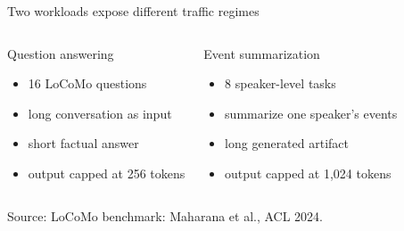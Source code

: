 \documentclass[aspectratio=169,10pt]{beamer}
\newcommand{\source}[1]{\vfill{\tiny\color{gray}Source: #1}}
\begin{document}
\begin{frame}{Two workloads expose different traffic regimes}
  \begin{columns}[T,onlytextwidth]
      \begin{block}{Question answering}
        \vspace{0.1cm}
        \begin{itemize}
          \item 16 LoCoMo questions
          \item long conversation as input
          \item short factual answer
          \item output capped at 256 tokens
        \end{itemize}
      \end{block}
      \begin{block}{Event summarization}
        \vspace{0.1cm}
        \begin{itemize}
          \item 8 speaker-level tasks
          \item summarize one speaker's events
          \item long generated artifact
          \item output capped at 1,024 tokens
        \end{itemize}
      \end{block}
  \end{columns}
  \source{LoCoMo benchmark: Maharana et al., ACL 2024.}
\end{frame}
\end{document}
